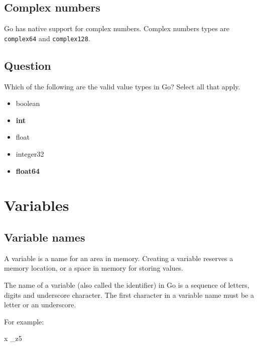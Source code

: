 \documentclass[]{book}
\newenvironment{Shaded}{\begin{snugshade}}{\end{snugshade}}
\newcommand{\NormalTok}[1]{#1}
\providecommand{\tightlist}{%
  \setlength{\itemsep}{0pt}\setlength{\parskip}{0pt}}
\begin{document}
\hypertarget{complex-numbers}{%
\subsection{Complex numbers}\label{complex-numbers}}

Go has native support for complex numbers. Complex numbers types are
\texttt{complex64} and \texttt{complex128}.

\hypertarget{question-8}{%
\subsection*{Question}\label{question-8}}

Which of the following are the valid value types in Go? Select all that apply.

\begin{itemize}
\tightlist
\item
  boolean
\item
  \textbf{int}
\item
  float
\item
  integer32
\item
  \textbf{float64}
\end{itemize}

\hypertarget{variables}{%
\section{Variables}\label{variables}}

\hypertarget{variable-names}{%
\subsection{Variable names}\label{variable-names}}

A variable is a name for an area in memory. Creating a variable reserves a
memory location, or a space in memory for storing values.

The name of a variable (also called the identifier) in Go is a sequence of
letters, digits and underscore character. The first character in a variable
name must be a letter or an underscore.

For example:

\begin{Shaded}
\begin{Highlighting}[]
\NormalTok{x}
\NormalTok{_z5}
\end{Highlighting}
\end{Shaded}
\end{document}
